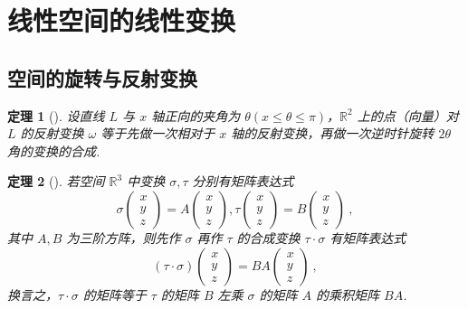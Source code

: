 \documentclass[zihao=-4,UTF8,linespread=1.8,nothm]{aytony_base}
\newtheorem{theorem}{\indent 定理}[subsection]
\begin{document}
\section{线性空间的线性变换}

\subsection{空间的旋转与反射变换}

\begin{theorem}[]
    设直线 $L$ 与 $x$ 轴正向的夹角为 $\theta (x \leqslant \theta \leqslant \pi)$，$\mathbb{R}^2$ 上的点（向量）对 $L$ 的反射变换 $\omega$ 等于先做一次相对于 $x$ 轴的反射变换，再做一次逆时针旋转 $2\theta$ 角的变换的合成.
\end{theorem}

\begin{theorem}[]
    若空间 $\mathbb{R}^3$ 中变换 $\sigma, \tau$ 分别有矩阵表达式 $$
        \sigma \left(
        \begin{matrix}
                x \\y\\z
            \end{matrix}
        \right) = A \left(
        \begin{matrix}
                x \\y\\z
            \end{matrix}
        \right), \tau \left(
        \begin{matrix}
                x \\y\\z
            \end{matrix}
        \right) = B \left(
        \begin{matrix}
                x \\y\\z
            \end{matrix}
        \right)\ ,
    $$ 其中 $A, B$ 为三阶方阵，则先作 $\sigma$ 再作 $\tau$ 的合成变换 $\tau \cdot \sigma$ 有矩阵表达式 $$
        (\tau \cdot \sigma)\left(
        \begin{matrix}
                x \\y\\z
            \end{matrix}
        \right) = BA \left(
        \begin{matrix}
                x \\y\\z
            \end{matrix}
        \right)\ ,
    $$ 换言之，$\tau \cdot \sigma$ 的矩阵等于 $\tau$ 的矩阵 $B$ 左乘 $\sigma$ 的矩阵 $A$ 的乘积矩阵 $BA$.
\end{theorem}
\end{document}
